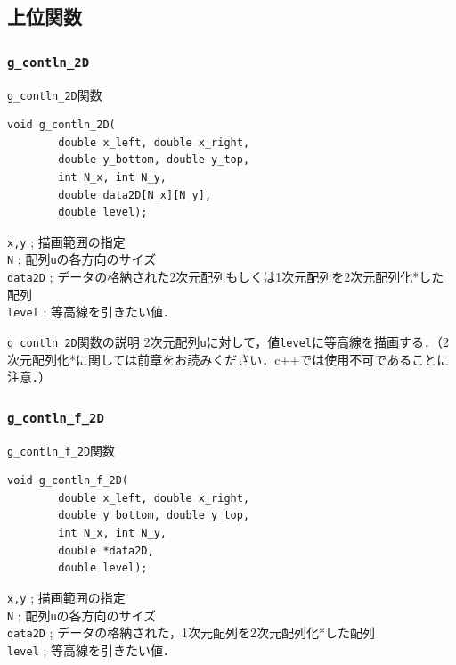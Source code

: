 \documentclass[a4paper,12pt]{jsarticle}%
\begin{document}
\clearpage
\subsection{上位関数}

\subsubsection{\texttt{g\_contln\_2D}}

\begin{itembox}[l]{\texttt{g\_contln\_2D}関数}
\begin{verbatim}
void g_contln_2D(
        double x_left, double x_right,
        double y_bottom, double y_top,
        int N_x, int N_y,
        double data2D[N_x][N_y],
        double level);
\end{verbatim}
\verb|x,y| ; 描画範囲の指定\\
\verb|N| ; 配列\verb|u|の各方向のサイズ\\
\verb|data2D| ; データの格納された2次元配列もしくは1次元配列を2次元配列化*した配列\\
\verb|level| ; 等高線を引きたい値．
\end{itembox}

\begin{itembox}[l]{\texttt{g\_contln\_2D}関数の説明}
2次元配列\verb|u|に対して，値\verb|level|に等高線を描画する．（2次元配列化*に関しては前章をお読みください．c++では使用不可であることに注意．）
\end{itembox}

\begin{figure}[htb]
\end{figure}




\clearpage
\subsubsection{\texttt{g\_contln\_f\_2D}}

\begin{itembox}[l]{\texttt{g\_contln\_f\_2D}関数}
\begin{verbatim}
void g_contln_f_2D(
        double x_left, double x_right,
        double y_bottom, double y_top,
        int N_x, int N_y,
        double *data2D,
        double level);
\end{verbatim}
\verb|x,y| ; 描画範囲の指定\\
\verb|N| ; 配列\verb|u|の各方向のサイズ\\
\verb|data2D| ; データの格納された，1次元配列を2次元配列化*した配列\\
\verb|level| ; 等高線を引きたい値．
\end{itembox}
\end{document}
